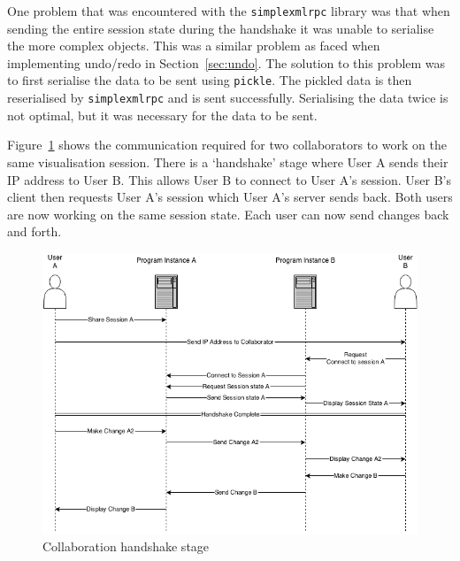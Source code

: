One problem that was encountered with the \texttt{simplexmlrpc} library was that when sending the entire session state during the handshake it was unable to serialise the more complex objects.  This was a similar problem as faced when implementing undo/redo in Section~\ref{sec:undo}.  The solution to this problem was to first serialise the data to be sent using \texttt{pickle}.  The pickled data is then reserialised by \texttt{simplexmlrpc} and is sent successfully.  Serialising the data twice is not optimal, but it was necessary for the data to be sent.

Figure~\ref{fig:collab_handshake} shows the communication required for two collaborators to work on the same visualisation session.  There is a `handshake' stage where User A sends their IP address to User B.  This allows User B to connect to User A's session.  User B's client then requests User A's session which User A's server sends back.  Both users are now working on the same session state.  Each user can now send changes back and forth.

\begin{figure}[h!]
    \centering
    \includegraphics[width=\textwidth]{images/minf_collab_diagram.png}
    \caption{Collaboration handshake stage}
    \label{fig:collab_handshake}
\end{figure}

